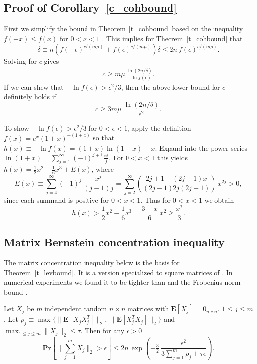 \documentclass{siamltex}
\begin{document}
\subsection{Proof of Corollary~\ref{c_cohbound}}\label{s_ccohproof}
First we simplify the bound in Theorem~\ref{t_cohbound} based on the
inequality $f(-x)\leq f(x)$ for $0<x<1$ .
This implies for Theorem~\ref{t_cohbound} that
$$\delta\equiv n\left(f(-\epsilon)^{c/(m\mu)}+
f(\epsilon)^{c/(m\mu)}\right)
\delta\leq 2n\>f(\epsilon)^{c/(m\mu)}.$$
Solving for $c$ gives 
\begin{eqnarray*}
c\geq m\mu\>\frac{\ln(2n/\delta)}{-\ln{f(\epsilon)}}.
\end{eqnarray*}
If we can show that $-\ln{f(\epsilon)}>\epsilon^2/3$, then
the above lower bound for $c$ definitely holds if
$$c\geq 3m\mu\>\frac{\ln(2n/\delta)}{\epsilon^2}.$$

To show $-\ln{f(\epsilon)}>\epsilon^2/3$ for $0<\epsilon<1$, apply 
the definition $f(x)= e^x(1+x)^{-(1+x)}$ so that
$h(x)\equiv -\ln{f(x)} = (1+x)\ln{(1+x)}-x$. 
Expand into the power series 
$\ln{(1+x)}=\sum_{j=1}^{\infty}{(-1)^{j+1} \tfrac{x^j}{j}}$.
For $0<x< 1$ this yields
$h(x)=\frac{1}{2}x^2-\frac{1}{6}x^3+E(x)$, where 
$$E(x)\equiv\sum_{j=4}^{\infty}{(-1)^j\>\frac{x^j}{(j-1)j}}=
\sum_{j=2}^{\infty}{
\left(\frac{2j+1-(2j-1)x}{(2j-1)2j(2j+1)}\right)\> x^{2j}}>0,$$
since each summand is positive for $0<x< 1$.
Thus for $0<x< 1$ we obtain
$$h(x)>\frac{1}{2}x^2-\frac{1}{6}x^3=
\frac{3-x}{6}\>x^2\geq \frac{x^2}{3}.$$

\subsection{Matrix Bernstein concentration inequality}\label{s_bernstein}
The matrix concentration inequality below is the basis for
Theorem~\ref{t_levbound}.
It is a version specialized to square matrices of \cite[Theorem 4]{Recht11}.
In numerical experiments we found it to be tighter than 
\cite[Theorem 4]{DMMS10} 
and the Frobenius norm bound \cite[Theorem 2]{DKM06}.

\begin{theorem}
Let $X_j$ be $m$ independent random $n\times n$ matrices
with ${\mathbf{E}}[X_j]=0_{n\times n}$, $1\leq j\leq m$. Let 
$\rho_j\equiv \max\{\|{\mathbf{E}}[X_jX_j^T]\|_2, \, \|{\mathbf{E}}[X_j^TX_j]\|_2\}$ and
$\max_{1\leq j\leq m}{\|X_j\|_2}\leq \tau$.
Then for any $\epsilon >0$ 
$${\mathbf{Pr}}\left[\|\sum_{j=1}^m{X_j}\|_2> \epsilon\right]\leq
2n\>\exp\left(-\tfrac{3}{2}\>\frac{\epsilon^2}{3\sum_{j=1}^m{\rho_j}
+\tau\epsilon}\right).$$
\end{theorem}
\end{document}

